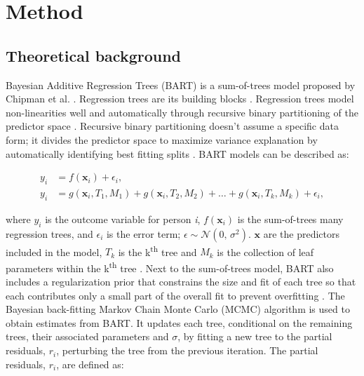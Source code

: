 \documentclass[10pt, a4paper, titlepage]{article}
\begin{document}
\section{Method}

\subsection{Theoretical background}
Bayesian Additive Regression Trees (BART) is a sum-of-trees model proposed by Chipman et al. \citep{chipman2010}. Regression trees are its building blocks \citep{chipman2010, hill2020, james2021}. Regression trees model non-linearities well and automatically through recursive binary partitioning of the predictor space \citep{hill2020, burgette2010}. Recursive binary partitioning doesn't assume a specific data form; it divides the predictor space to maximize variance explanation by automatically identifying best fitting splits \citep{hastie2017, james2021, salditt2023}. BART models can be described as:

\begin{subequations}
\label{eq:BART}
\begin{align}
y_i &= f(\textbf{x}_i) + \epsilon_i, \tag{1.1} \\
y_i &= g(\textbf{x}_{i}, T_{1}, M_{1})+ g(\textbf{x}_{i}, T_{2}, M_{2}) + \dots + g(\textbf{x}_{i}, T_{k}, M_{k}) + \epsilon_i, \tag{1.2}
\end{align}
\end{subequations}

where $y_i$ is the outcome variable for person \textit{i}, $f(\textbf{x}_i)$ is the sum-of-trees many regression trees, and $\epsilon_i$ is the error term; $\epsilon \sim \mathcal{N}(0,\,\sigma^{2})$. $\textbf{x}$ are the predictors included in the model, $T_{k}$ is the k\textsuperscript{th} tree and $M_{k}$ is the collection of leaf parameters within the k\textsuperscript{th} tree \citep{chipman2010, hill2020, james2021}. Next to the sum-of-trees model, BART also includes a regularization prior that constrains the size and fit of each tree so that each contributes only a small part of the overall fit to prevent overfitting \citep{chipman2010, hill2020, james2021}. The Bayesian back-fitting Markov Chain Monte Carlo (MCMC) algorithm is used to obtain estimates from BART. It updates each tree, conditional on the remaining trees, their associated parameters and $\sigma$, by fitting a new tree to the partial residuals, $r_{i}$, perturbing the tree from the previous iteration. The partial residuals, $r_{i}$, are defined as:
\end{document}
